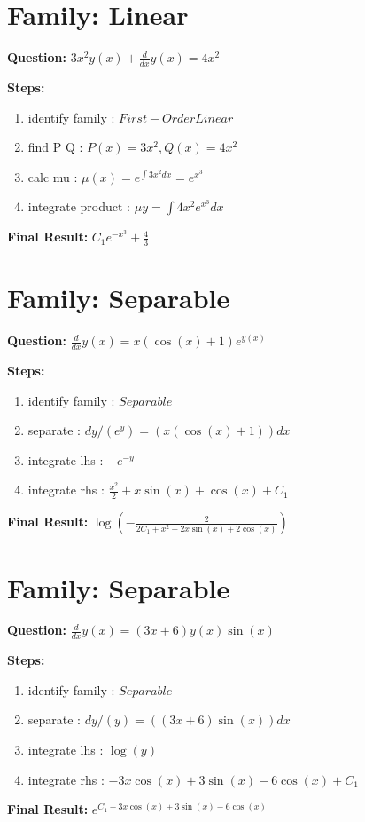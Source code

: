 \documentclass{article}
\begin{document}
\section*{Family: Linear}
\textbf{Question:} $3 x^{2} y{\left(x \right)} + \frac{d}{d x} y{\left(x \right)} = 4 x^{2}$

\textbf{Steps:}
\begin{enumerate}
\item identify family :  $First-Order Linear$
\item find P Q :  $P(x)=3 x^{2}, Q(x)=4 x^{2}$
\item calc mu :  $\mu(x) = e^{\int 3 x^{2} dx} = e^{x^{3}}$
\item integrate product :  $\mu y = \int 4 x^{2} e^{x^{3}} dx$
\end{enumerate}
\textbf{Final Result:} $C_{1} e^{- x^{3}} + \frac{4}{3}$

\section*{Family: Separable}
\textbf{Question:} $\frac{d}{d x} y{\left(x \right)} = x \left(\cos{\left(x \right)} + 1\right) e^{y{\left(x \right)}}$

\textbf{Steps:}
\begin{enumerate}
\item identify family :  $Separable$
\item separate :  $dy / (e^{y}) = (x \left(\cos{\left(x \right)} + 1\right)) dx$
\item integrate lhs :  $- e^{- y}$
\item integrate rhs :  $\frac{x^{2}}{2} + x \sin{\left(x \right)} + \cos{\left(x \right)} + C_1$
\end{enumerate}
\textbf{Final Result:} $\log{\left(- \frac{2}{2 C_{1} + x^{2} + 2 x \sin{\left(x \right)} + 2 \cos{\left(x \right)}} \right)}$

\section*{Family: Separable}
\textbf{Question:} $\frac{d}{d x} y{\left(x \right)} = \left(3 x + 6\right) y{\left(x \right)} \sin{\left(x \right)}$

\textbf{Steps:}
\begin{enumerate}
\item identify family :  $Separable$
\item separate :  $dy / (y) = (\left(3 x + 6\right) \sin{\left(x \right)}) dx$
\item integrate lhs :  $\log{\left(y \right)}$
\item integrate rhs :  $- 3 x \cos{\left(x \right)} + 3 \sin{\left(x \right)} - 6 \cos{\left(x \right)} + C_1$
\end{enumerate}
\textbf{Final Result:} $e^{C_{1} - 3 x \cos{\left(x \right)} + 3 \sin{\left(x \right)} - 6 \cos{\left(x \right)}}$
\end{document}
